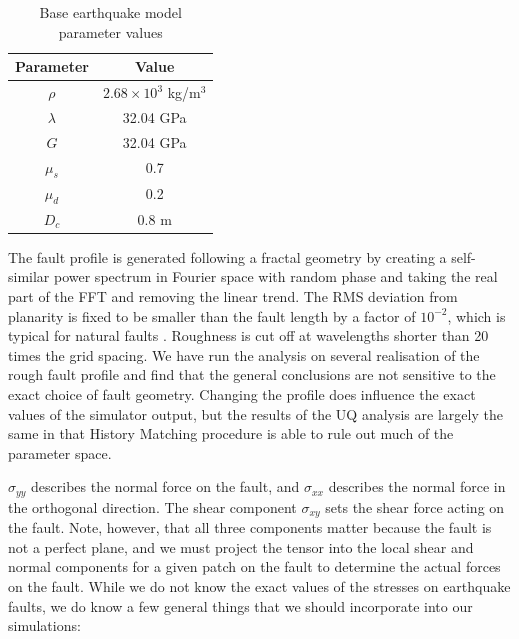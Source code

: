 \documentclass[openacc]{rstransa}%
\begin{document}
\begin{table}[!h]
\caption{Base earthquake model parameter values}
\label{table_eq}
\begin{tabular}{cc}%
\hline
Parameter & Value \\
\hline
$\rho$ & $2.68 \times 10^3$ kg/m$^3$ \\
$\lambda$ & 32.04 GPa \\
$G$ & 32.04 GPa \\
$\mu_s$ & 0.7 \\
$\mu_d$ & 0.2 \\
$D_c$ & 0.8 m \\
\hline
\end{tabular}
\vspace*{-4pt}
\end{table}%

The fault profile is generated following a fractal geometry by creating a self-similar power spectrum in
Fourier space with random phase and taking the real part of the FFT and removing the linear trend.
The RMS deviation from planarity is fixed to be smaller than the fault length by a factor of $10^{-2}$,
which is typical
for natural faults \cite{dunhametal}. Roughness is cut off at wavelengths shorter than 20 times the
grid spacing. We have run the analysis on several realisation of the rough
fault profile and find that the general conclusions are not sensitive
to the exact choice of fault geometry. Changing the profile does influence
the exact values of the simulator output, but the results of the UQ analysis
are largely the same in that History Matching procedure is able to rule out
much of the parameter space.

$\sigma_{yy}$ describes the normal force on the fault, and $\sigma_{xx}$ describes the normal force in the orthogonal direction. The shear component $\sigma_{xy}$ sets the shear force acting on the fault. Note, however, that all three components matter because the fault is not a perfect plane, and we must project the tensor into the local shear and normal components for a given patch on the fault to determine the actual forces on the fault.
While we do not know the exact values of the stresses on earthquake faults, we do know a few general things that we should incorporate into our simulations:
\end{document}
